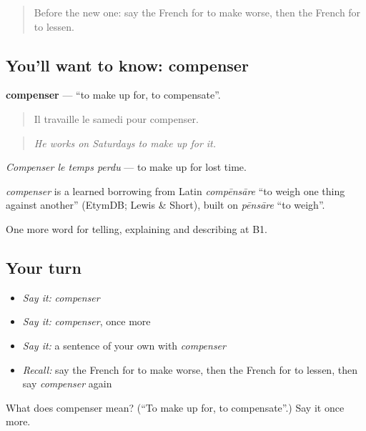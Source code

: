 \label{lesson:FR-C353-compenser}



\begin{quote}
Before the new one: say the French for to make worse, then the French for to lessen.
\end{quote}

\subsection*{You'll want to know: compenser}
\textbf{compenser} — \textquotedblleft{}to make up for, to compensate\textquotedblright{}.

\begin{quote}
Il travaille le samedi pour compenser.
\end{quote}

\begin{quote}
\emph{He works on Saturdays to make up for it.}
\end{quote}

\emph{Compenser le temps perdu} — to make up for lost time.

\begin{cousinweb}
\emph{compenser} is a learned borrowing from Latin \emph{compēnsāre} \textquotedblleft{}to weigh one thing against another\textquotedblright{} (EtymDB; Lewis \& Short), built on \emph{pēnsāre} \textquotedblleft{}to weigh\textquotedblright{}.
\end{cousinweb}

\begin{grammarlens}[title={What you've built}]
One more word for telling, explaining and describing at B1.
\end{grammarlens}

\subsection*{Your turn}
\begin{itemize}
\raggedright
  \item \emph{Say it:} \emph{compenser}
  \item \emph{Say it:} \emph{compenser}, once more
  \item \emph{Say it:} a sentence of your own with \emph{compenser}
  \item \emph{Recall:} say the French for to make worse, then the French for to lessen, then say \emph{compenser} again
\end{itemize}

\begin{tcolorbox}[breakable,colback=teal!4,colframe=teal!35!black,title={Before you move on}]
What does compenser mean? (\textquotedblleft{}To make up for, to compensate\textquotedblright{}.) Say it once more.
\end{tcolorbox}
